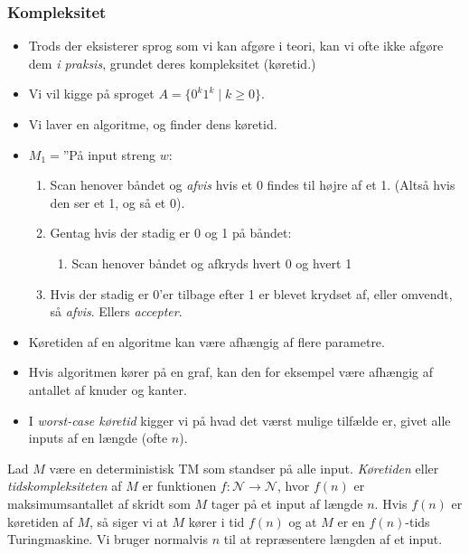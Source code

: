 \begin{frame}[allowframebreaks]
	\frametitle{Kompleksitet}
	\begin{itemize}
		\item Trods der eksisterer sprog som vi kan afgøre i teori, kan vi ofte ikke afgøre dem \textit{i praksis}, grundet deres kompleksitet (køretid.)
		\item Vi vil kigge på sproget $A = \{0^{k}1^{k} \mid k \ge 0\}$.
		\item Vi laver en algoritme, og finder dens køretid.
		\item $M_{1} = $''På input streng $w$:
		      \begin{enumerate}
			      \item Scan henover båndet og \textit{afvis} hvis et 0 findes til højre af et 1. (Altså hvis den ser et 1, og så et 0).
			      \item Gentag hvis der stadig er 0 og 1 på båndet:
			            \begin{enumerate}
				            \item Scan henover båndet og afkryds hvert 0 og hvert 1
			            \end{enumerate}

			      \item Hvis der stadig er 0'er tilbage efter 1 er blevet krydset af, eller omvendt, så \textit{afvis}. Ellers \textit{accepter}.
		      \end{enumerate}

		\item Køretiden af en algoritme kan være afhængig af flere parametre.
		\item Hvis algoritmen kører på en graf, kan den for eksempel være afhængig af antallet af knuder og kanter.
		\item I \textit{worst-case køretid} kigger vi på hvad det værst mulige tilfælde er, givet alle inputs af en længde (ofte $n$).
	\end{itemize}
	\begin{definition}
		Lad $M$ være en deterministisk TM som standser på alle input. \textit{Køretiden} eller \textit{tidskompleksiteten} af $M$ er funktionen $f : \mathcal{N} \rightarrow \mathcal{N}$, hvor $f(n)$ er maksimumsantallet af skridt som $M$ tager på et input af længde $n$. Hvis $f(n)$ er køretiden af $M$, så siger vi at $M$ kører i tid $f(n)$ og at $M$ er en $f(n)$-tids Turingmaskine. Vi bruger normalvis $n$ til at repræsentere længden af et input.
	\end{definition}
\end{frame}

